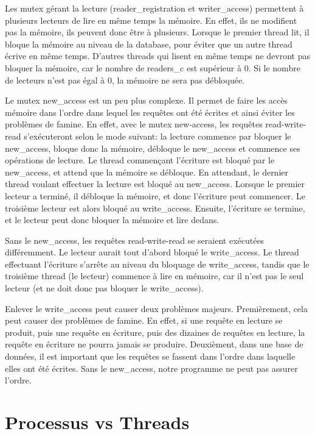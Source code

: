 \documentclass[utf8]{article}
\begin{document}
\begin{large}
\par
Les mutex gérant la lecture (reader\_registration et writer\_access) permettent à plusieurs lecteurs de lire en même temps la
mémoire. En effet, ils ne modifient pas la mémoire, ils peuvent donc être à
plusieurs. Lorsque le premier thread lit, il bloque la mémoire au niveau de la
database, pour éviter que un autre thread écrive en même temps. D'autres threads
qui lisent en même temps ne devront pas bloquer la mémoire, car le nombre de
readers\_c est supérieur à 0. Si le nombre de lecteurs n'est pas égal à 0,
la mémoire ne sera pas débloquée.
\par
Le mutex new\_access est un peu plus complexe. Il permet de faire les accès mémoire
dans l'ordre dans lequel les requêtes ont été écrites et ainsi éviter les problèmes de
famine. En effet, avec le mutex new-access, les requêtes read-write-read s'exécuteront selon le mode suivant: la lecture commence par
bloquer le new\_access, bloque donc la mémoire, débloque le new\_access et
commence ses opérations de lecture. Le thread commençant l'écriture est bloqué par le
new\_access, et attend que la mémoire se débloque. En attendant, le dernier
thread voulant effectuer la lecture est bloqué au new\_access. Lorsque le
premier lecteur a terminé, il débloque la mémoire, et donc l'écriture peut
commencer. Le troisième lecteur est alors bloqué au write\_access. Ensuite,
l'écriture se termine, et le lecteur peut donc bloquer la mémoire et lire dedans.
\par
Sans le new\_access, les requêtes read-write-read se seraient
exécutées différemment. Le lecteur aurait tout d'abord bloqué le write\_access.
Le thread effectuant l'écriture s'arrête au niveau du bloquage de
write\_access, tandis que le troisième thread (le lecteur) commence à lire en
mémoire, car il n'est pas le seul lecteur (et ne doit donc pas bloquer le
write\_access).
\par
Enlever le write\_access peut causer deux problèmes majeurs. Premièrement, cela
peut causer des problèmes de famine. En effet, si une requête en lecture se
produit, puis une requête en écriture, puis des dizaines de requêtes en lecture,
la requête en écriture ne pourra jamais se produire. Deuxièment, dans une base
de données, il est important que les requêtes se fassent dans l'ordre dans
laquelle elles ont été écrites. Sans le new\_access, notre programme ne peut pas
assurer l'ordre.
\par
\section{Processus vs Threads}
\par
\indent


\end{large}
\end{document}
